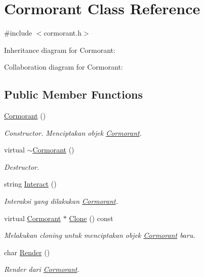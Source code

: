 \hypertarget{classCormorant}{}\section{Cormorant Class Reference}
\label{classCormorant}


{\ttfamily \#include $<$cormorant.\+h$>$}



Inheritance diagram for Cormorant\+:


Collaboration diagram for Cormorant\+:
\subsection*{Public Member Functions}
\begin{DoxyCompactItemize}
\item 
\hyperlink{classCormorant_a1c93b60af03db473c444783df366a2ae}{Cormorant} ()
\begin{DoxyCompactList}\small\item\em Constructor. Menciptakan objek \hyperlink{classCormorant}{Cormorant}. \end{DoxyCompactList}\item 
virtual \hyperlink{classCormorant_af24217c3b840dcf95b0961d68a241034}{$\sim$\+Cormorant} ()
\begin{DoxyCompactList}\small\item\em Destructor. \end{DoxyCompactList}\item 
string \hyperlink{classCormorant_af28984652ae999452d20aed885f0185a}{Interact} ()
\begin{DoxyCompactList}\small\item\em Interaksi yang dilakukan \hyperlink{classCormorant}{Cormorant}. \end{DoxyCompactList}\item 
virtual \hyperlink{classCormorant}{Cormorant} $\ast$ \hyperlink{classCormorant_a7be371562fab8ab5c2e9e72386ee9aa2}{Clone} () const 
\begin{DoxyCompactList}\small\item\em Melakukan cloning untuk menciptakan objek \hyperlink{classCormorant}{Cormorant} baru. \end{DoxyCompactList}\item 
char \hyperlink{classCormorant_a6d388885acfc98de6020a01b90259dac}{Render} ()
\begin{DoxyCompactList}\small\item\em Render dari \hyperlink{classCormorant}{Cormorant}. \end{DoxyCompactList}\end{DoxyCompactItemize}
